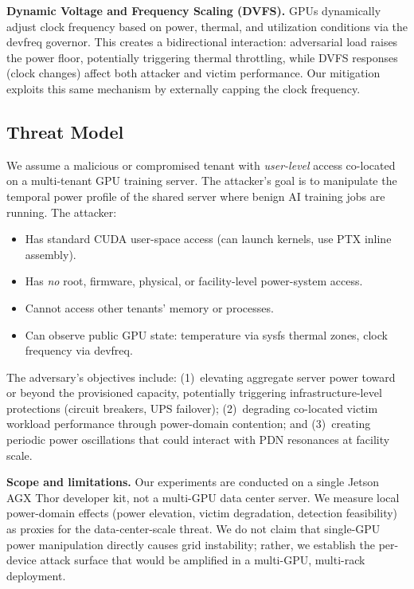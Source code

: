 \documentclass[letterpaper,twocolumn,10pt]{article}
\begin{document}
\textbf{Dynamic Voltage and Frequency Scaling (DVFS).}
GPUs dynamically adjust clock frequency based on power, thermal, and
utilization conditions via the devfreq governor.  This creates a
bidirectional interaction: adversarial load raises the power floor,
potentially triggering thermal throttling, while DVFS responses
(clock changes) affect both attacker and victim performance.  Our
mitigation exploits this same mechanism by externally capping the
clock frequency.

\subsection{Threat Model}
\label{sec:threat}

We assume a malicious or compromised tenant with \emph{user-level}
access co-located on a multi-tenant GPU training server.  The
attacker's goal is to manipulate the temporal power profile of the
shared server where benign AI training jobs are running.  The
attacker:

\begin{itemize}[nosep]
\item Has standard CUDA user-space access (can launch kernels, use
  PTX inline assembly).
\item Has \emph{no} root, firmware, physical, or facility-level
  power-system access.
\item Cannot access other tenants' memory or processes.
\item Can observe public GPU state: temperature via sysfs thermal
  zones, clock frequency via devfreq.
\end{itemize}

The adversary's objectives include: (1)~elevating aggregate server
power toward or beyond the provisioned capacity, potentially
triggering infrastructure-level protections (circuit breakers,
UPS failover); (2)~degrading co-located victim workload performance
through power-domain contention; and (3)~creating periodic power
oscillations that could interact with PDN resonances at facility
scale.

\textbf{Scope and limitations.}  Our experiments are conducted on a
single Jetson AGX Thor developer kit, not a multi-GPU data center
server.  We measure local power-domain effects (power elevation,
victim degradation, detection feasibility) as proxies for the
data-center-scale threat.  We do not claim that single-GPU power
manipulation directly causes grid instability; rather, we establish
the per-device attack surface that would be amplified in a
multi-GPU, multi-rack deployment.
\end{document}
